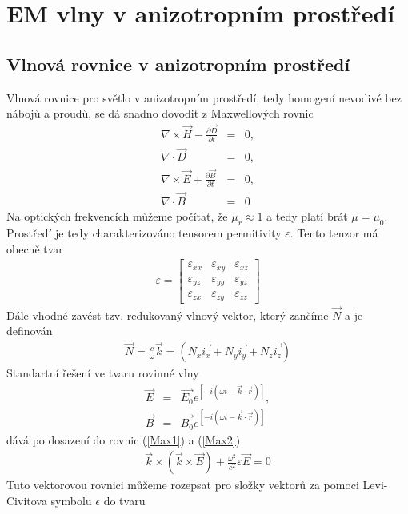 \chapter{EM vlny v anizotropním prostředí}
\section{Vlnová rovnice v anizotropním prostředí}
Vlnová rovnice pro světlo v anizotropním prostředí, tedy homogení nevodivé bez nábojů a proudů, se dá snadno dovodit z Maxwellových rovnic
\begin{eqnarray}
\nabla \times\vec{H} - \frac{\partial\vec{D}}{\partial t} &=& 0 , \label{Max1} \\
\nabla \cdot \vec{D} &=& 0, \label{Max2} \\
\nabla \times \vec{E} + \frac{\partial \vec{B}}{\partial t} &=& 0, \label{Max3}\\
\nabla\cdot\vec{B}&=&0 \label{Max4}
\end{eqnarray}
Na optických frekvencích můžeme počítat, že $\mu_r\approx1$ a tedy platí brát $\mu=\mu_0$. Prostředí je tedy charakterizováno tensorem permitivity $\varepsilon$. Tento tenzor má obecně tvar
\begin{eqnarray}
\varepsilon=
\begin{bmatrix}
\varepsilon_{xx} & \varepsilon_{xy} & \varepsilon_{xz} \\
\varepsilon_{yz}& \varepsilon_{yy}& \varepsilon_{yz} \\
\varepsilon_{zx}& \varepsilon_{zy}& \varepsilon_{zz}
\end{bmatrix}
\end{eqnarray}
Dále vhodné zavést tzv. redukovaný vlnový vektor, který zančíme $\vec{N}$ a je definován
\begin{eqnarray}
\vec{N}=\frac{c}{\omega}\vec{k} = (N_x\vec{i_x}+N_y\vec{i_y}+N_z\vec{i_z})
\end{eqnarray}
Standartní řešení ve tvaru rovinné vlny
\begin{eqnarray}
\vec{E} &=& \vec{E_0}e^{[-i(\omega t-\vec{k}\cdot\vec{r})]}, \\
\vec{B} &=& \vec{B_0}e^{[-i(\omega t-\vec{k}\cdot\vec{r})]}
\end{eqnarray}
dává po dosazení do rovnic (\ref{Max1}) a (\ref{Max2})
\begin{eqnarray}
\vec{k}\times(\vec{k}\times\vec{E}) + \frac{\omega^2}{c^2}\varepsilon\vec{E}=0
\end{eqnarray}
Tuto vektorovou rovnici můžeme rozepsat pro složky vektorů za pomoci Levi-Civitova symbolu $\epsilon$ do tvaru
